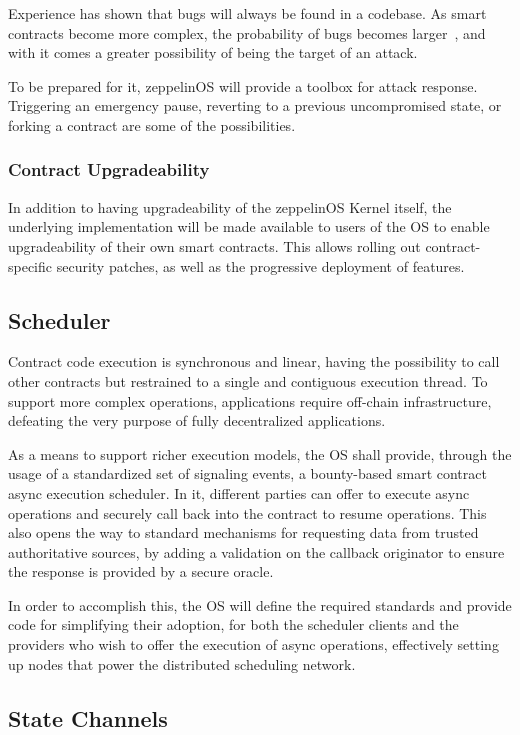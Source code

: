 \documentclass[]{article}
\makeatletter
\DeclareRobustCommand{\_}{%
  \leavevmode\vbox{%
    \hrule\@width.5em
          \@height-.26ex
          \@depth\dimexpr.26ex+.28pt\relax}}
\makeatother
\begin{document}
Experience has shown that bugs will always be found in a codebase. As smart
contracts become more complex, the probability of bugs becomes
larger~\cite{schneier}, and with it comes a greater possibility of being the
target of an attack.

To be prepared for it, zeppelinOS will provide a toolbox for attack response.
Triggering an emergency pause, reverting to a previous uncompromised
state, or forking a contract are some of the possibilities.

\subsubsection{Contract Upgradeability}

In addition to having upgradeability of the zeppelinOS Kernel itself,
the underlying implementation will be made available to users of the OS
to enable upgradeability of their own smart contracts. This allows
rolling out contract-specific security patches, as well as the
progressive deployment of features.

\subsection{Scheduler}

Contract code execution is synchronous and linear, having the
possibility to call other contracts but restrained to a single and
contiguous execution thread. To support more complex operations,
applications require off-chain infrastructure, defeating the very
purpose of fully decentralized applications.

As a means to support richer execution models, the OS shall provide,
through the usage of a standardized set of signaling events, a
bounty-based smart contract async execution scheduler. In it, different
parties can offer to execute async operations and securely call back
into the contract to resume operations. This also opens the way to
standard mechanisms for requesting data from trusted authoritative
sources, by adding a validation on the callback originator to ensure the
response is provided by a secure oracle.

In order to accomplish this, the OS will define the required standards
and provide code for simplifying their adoption, for both the scheduler
clients and the providers who wish to offer the execution of async
operations, effectively setting up nodes that power the distributed
scheduling network.

\subsection{State Channels}
\end{document}
